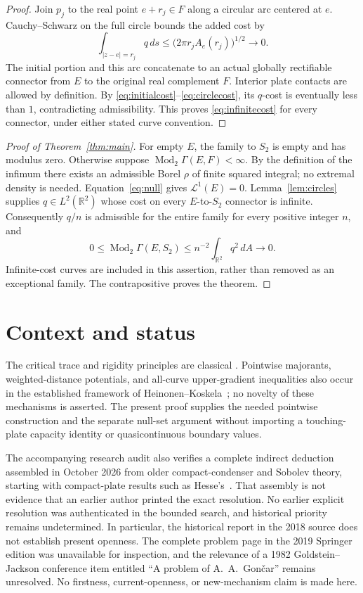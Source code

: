 \documentclass[11pt]{article}
\newcommand{\R}{\mathbb R}
\newcommand{\Mod}{\operatorname{Mod}_2}
\newcommand{\length}{\mathcal L^1}
\begin{document}
\begin{proof}
Join $p_j$ to the real point $e+r_j\in F$ along a circular arc centered at
$e$. Cauchy--Schwarz on the full circle bounds the added cost by
\begin{equation}\label{eq:circlecost}
 \int_{|z-e|=r_j}q\,ds
 \leq\bigl(2\pi r_j A_e(r_j)\bigr)^{1/2}\longrightarrow0.
\end{equation}
The initial portion and this arc concatenate to an actual globally
rectifiable connector from $E$ to the original real complement $F$.
Interior plate contacts are allowed by definition. By
\eqref{eq:initialcost}--\eqref{eq:circlecost}, its $q$-cost is eventually
less than $1$, contradicting admissibility. This proves
\eqref{eq:infinitecost} for every connector, under either stated curve
convention.
\end{proof}

\begin{proof}[Proof of Theorem~\ref{thm:main}]
For empty $E$, the family to $S_2$ is empty and has modulus zero. Otherwise
suppose $\Mod\Gamma(E,F)<\infty$. By the definition of the infimum there
exists an admissible Borel $\rho$ of finite squared integral; no extremal
density is needed. Equation~\eqref{eq:null} gives $\length(E)=0$.
Lemma~\ref{lem:circles} supplies $q\in L^2(\R^2)$ whose cost on every
$E$-to-$S_2$ connector is infinite. Consequently $q/n$ is admissible for
the entire family for every positive integer $n$, and
\[
 0\leq\Mod\Gamma(E,S_2)
 \leq n^{-2}\int_{\R^2}q^2\,dA\longrightarrow0.
\]
Infinite-cost curves are included in this assertion, rather than removed
as an exceptional family. The contrapositive proves the theorem.
\end{proof}

\section{Context and status}

The critical trace and rigidity principles are classical
\cite{DNPV,Brezis}. Pointwise majorants, weighted-distance potentials,
and all-curve upper-gradient inequalities also occur in the established
framework of Heinonen--Koskela~\cite{HK}; no novelty of these mechanisms
is asserted. The present proof supplies the needed pointwise construction
and the separate null-set argument without importing a touching-plate
capacity identity or quasicontinuous boundary values.

The accompanying research audit also verifies a complete indirect
deduction assembled in October 2026 from older compact-condenser and
Sobolev theory, starting with compact-plate results such as
Hesse's~\cite{Hesse}. That assembly is not evidence that an earlier author
printed the exact resolution. No earlier explicit resolution was
authenticated in the bounded search, and historical priority remains
undetermined. In particular, the historical report in the 2018 source
does not establish present openness. The complete problem page in the
2019 Springer edition was unavailable for inspection, and the relevance
of a 1982 Goldstein--Jackson conference item entitled ``A problem of
A.~A.~Gon\v car'' remains unresolved. No firstness, current-openness, or
new-mechanism claim is made here.
\end{document}
